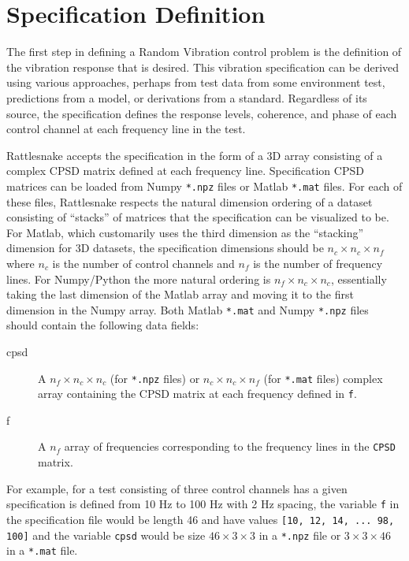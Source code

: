 \documentclass[pdf,12pt,report]{SANDreport}
\newcommand{\inlineCode}{\lstinline[basicstyle=\bfseries\ttfamily]}
\begin{document}
    \section{Specification Definition}
    The first step in defining a Random Vibration control problem is the definition of the vibration response that is desired.  This vibration specification can be derived using various approaches, perhaps from test data from some environment test, predictions from a model, or derivations from a standard.  Regardless of its source, the specification defines the response levels, coherence, and phase of each control channel at each frequency line in the test.
    
    Rattlesnake accepts the specification in the form of a 3D array consisting of a complex \ac{CPSD} matrix defined at each frequency line.  Specification \ac{CPSD} matrices can be loaded from Numpy \inlineCode{*.npz} files or Matlab \inlineCode{*.mat} files.  For each of these files, Rattlesnake respects the natural dimension ordering of a dataset consisting of ``stacks'' of matrices that the specification can be visualized to be.  For Matlab, which customarily uses the third dimension as the ``stacking'' dimension for 3D datasets, the specification dimensions should be $n_c \times n_c \times n_f$ where $n_c$ is the number of control channels and $n_f$ is the number of frequency lines.  For Numpy/Python the more natural ordering is $n_f \times n_c \times n_c$, essentially taking the last dimension of the Matlab array and moving it to the first dimension in the Numpy array.  Both Matlab \inlineCode{*.mat} and Numpy \inlineCode{*.npz} files should contain the following data fields:
    
    \begin{description}
        \item[cpsd] A $n_f \times n_c \times n_c$ (for \inlineCode{*.npz} files) or $n_c \times n_c \times n_f$ (for \inlineCode{*.mat} files) complex array containing the \ac{CPSD} matrix at each frequency defined in \inlineCode{f}.
        \item[f] A $n_f$ array of frequencies corresponding to the frequency lines in the \inlineCode{CPSD} matrix.
    \end{description}

    For example, for a test consisting of three control channels has a given specification is defined from 10 Hz to 100 Hz with 2 Hz spacing, the variable \inlineCode{f} in the specification file would be length 46 and have values \inlineCode{[10, 12, 14, ... 98, 100]} and the variable \inlineCode{cpsd} would be size $46\times3\times3$ in a \inlineCode{*.npz} file or $3\times3\times46$ in a \inlineCode{*.mat} file.
    
\end{document}
